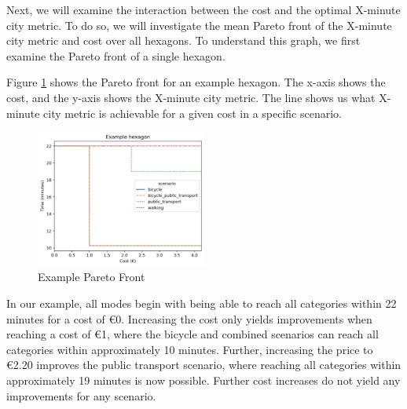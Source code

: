 Next, we will examine the interaction between the cost and the optimal X-minute city metric.
To do so, we will investigate the mean Pareto front of the X-minute city metric and cost over all hexagons.
To understand this graph, we first examine the Pareto front of a single hexagon.

Figure \ref{fig:example_pareto_front} shows the Pareto front for an example hexagon.
The x-axis shows the cost, and the y-axis shows the X-minute city metric.
The line shows us what X-minute city metric is achievable for a given cost in a specific scenario.

\begin{figure}
  \begin{center}
     \includegraphics[width=0.5\textwidth]{Figures/results/metric_cost/example_profile}
  \end{center}
  \caption{Example Pareto Front}
  \label{fig:example_pareto_front}
\end{figure}

In our example, all modes begin with being able to reach all categories within 22 minutes for a cost of \euro{0}.
Increasing the cost only yields improvements when reaching a cost of \euro{1}, where the bicycle and combined scenarios can reach all categories within approximately 10 minutes.
Further, increasing the price to \euro{2.20} improves the public transport scenario, where reaching all categories within approximately 19 minutes is now possible.
Further cost increases do not yield any improvements for any scenario.

